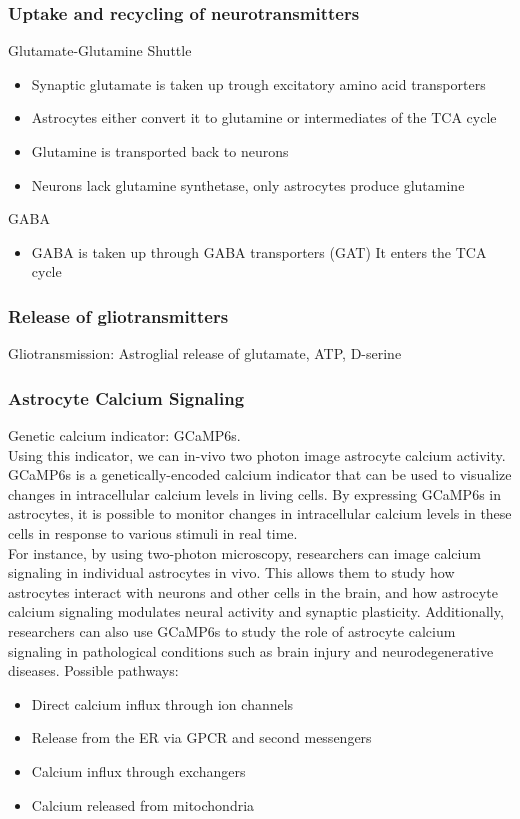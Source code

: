 \begin{itemize}
\begin{itemize}
\subsubsection{Uptake and recycling of neurotransmitters}
Glutamate-Glutamine Shuttle
\begin{itemize}
    \item Synaptic glutamate is taken up trough excitatory amino acid transporters
    \item Astrocytes either convert it to glutamine or intermediates of the TCA cycle
    \item Glutamine is transported back to neurons
    \item Neurons lack glutamine synthetase, only astrocytes produce glutamine
\end{itemize}
GABA
\begin{itemize}
    \item GABA is taken up through GABA transporters (GAT)
    It enters the TCA cycle
\end{itemize}
\subsubsection{Release of gliotransmitters}
Gliotransmission: Astroglial release of glutamate, ATP, D-serine
\subsubsection{Astrocyte Calcium Signaling}
Genetic calcium indicator: GCaMP6s. \\Using this indicator, we can in-vivo two photon image astrocyte calcium activity. 
GCaMP6s is a genetically-encoded calcium indicator that can be used to visualize changes in intracellular calcium levels in living cells. By expressing GCaMP6s in astrocytes, it is possible to monitor changes in intracellular calcium levels in these cells in response to various stimuli in real time.
\\
For instance, by using two-photon microscopy, researchers can image calcium signaling in individual astrocytes in vivo. This allows them to study how astrocytes interact with neurons and other cells in the brain, and how astrocyte calcium signaling modulates neural activity and synaptic plasticity. Additionally, researchers can also use GCaMP6s to study the role of astrocyte calcium signaling in pathological conditions such as brain injury and neurodegenerative diseases.
Possible pathways:
\begin{itemize}
    \item Direct calcium influx through ion channels
    \item Release from the ER via GPCR and second messengers
    \item Calcium influx through exchangers
    \item Calcium released from mitochondria
\end{itemize}


\end{itemize}
\end{itemize}
